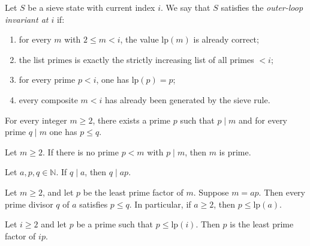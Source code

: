 \begin{definition}
    \label{def:outer_invariant}
    Let $S$ be a sieve state with current index $i$.
    We say that $S$ satisfies the \emph{outer-loop invariant at $i$} if:
    \begin{enumerate}
        \item for every $m$ with $2\le m < i$, the value $\mathrm{lp}(m)$ is already correct;
        \item the list $\mathrm{primes}$ is exactly the strictly increasing list of all primes $< i$;
        \item for every prime $p < i$, one has $\mathrm{lp}(p)=p$;
        \item every composite $m < i$ has already been generated by the sieve rule.
    \end{enumerate}
\end{definition}

\begin{lemma}
    \label{lem:lpf_exists}
    For every integer $m\ge 2$, there exists a prime $p$ such that $p\mid m$ and
    for every prime $q\mid m$ one has $p\le q$.
\end{lemma}

\begin{lemma}
    \label{lem:no_small_divisor_prime}
    Let $m\ge 2$.
    If there is no prime $p < m$ with $p\mid m$, then $m$ is prime.
\end{lemma}

\begin{lemma}
    \label{lem:divisor_lifts_to_product}
    Let $a,p,q\in\mathbb{N}$.
    If $q\mid a$, then $q\mid ap$.
\end{lemma}

\begin{lemma}
    \label{lem:lpf_monotone_along_decomp}
    Let $m\ge 2$, and let $p$ be the least prime factor of $m$.
    Suppose $m=ap$.
    Then every prime divisor $q$ of $a$ satisfies $p\le q$.
    In particular, if $a\ge 2$, then $p \le \mathrm{lp}(a)$.
\end{lemma}

\begin{lemma}
    \label{lem:write_correct}
    Let $i\ge 2$ and let $p$ be a prime such that $p \le \mathrm{lp}(i)$.
    Then $p$ is the least prime factor of $ip$.
\end{lemma}

